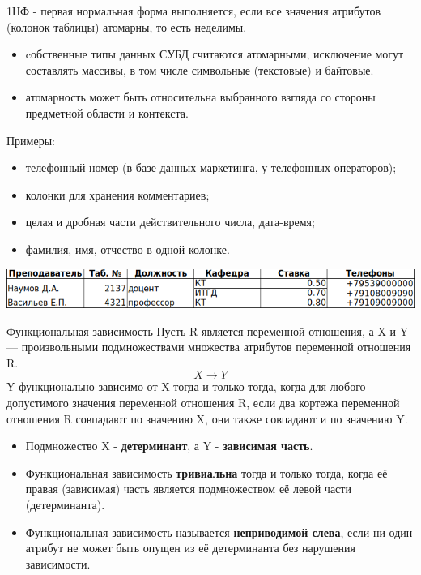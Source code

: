 \documentclass{beamer}
\begin{document}
\begin{frame}
\begin{block}{1НФ - первая нормальная форма}
выполняется, если все значения атрибутов (колонок таблицы) атомарны, то есть неделимы.
\end{block}
\begin{itemize}
\item cобственные типы данных СУБД считаются атомарными, исключение
могут составлять массивы, в том числе символьные (текстовые) и байтовые.
\item атомарность может быть относительна выбранного взгляда со стороны предметной области и контекста. 
\end{itemize}
Примеры:
\begin{itemize}
\item телефонный номер (в базе данных маркетинга, у телефонных операторов);
\item колонки для хранения комментариев;
\item целая и дробная части действительного числа, дата-время;
\item фамилия, имя, отчество в одной колонке.
\end{itemize}
\begin{center}
\includegraphics[scale=1.5]{images/ex-rasp-06.png}
\end{center}
\end{frame} 

\begin{frame}
\begin{block}{Функциональная зависимость}
Пусть R является переменной отношения, а X и Y — произвольными подмножествами множества атрибутов переменной отношения R. 
\[X\rightarrow Y\]
Y функционально зависимо от X тогда и только тогда, когда для любого допустимого значения переменной отношения R, если два кортежа переменной отношения R совпадают по значению X, они также совпадают и по значению Y.
\end{block}
\begin{itemize}
\item Подмножество X - \textbf{детерминант}, а Y - \textbf{зависимая часть}.
\item Функциональная зависимость \textbf{тривиальна} тогда и только тогда, когда её правая (зависимая) часть является подмножеством её левой части (детерминанта).
\item Функциональная зависимость называется \textbf{неприводимой слева}, если ни один атрибут не может быть опущен из её детерминанта без нарушения зависимости. 
\end{itemize}
\end{frame}
\end{document}
